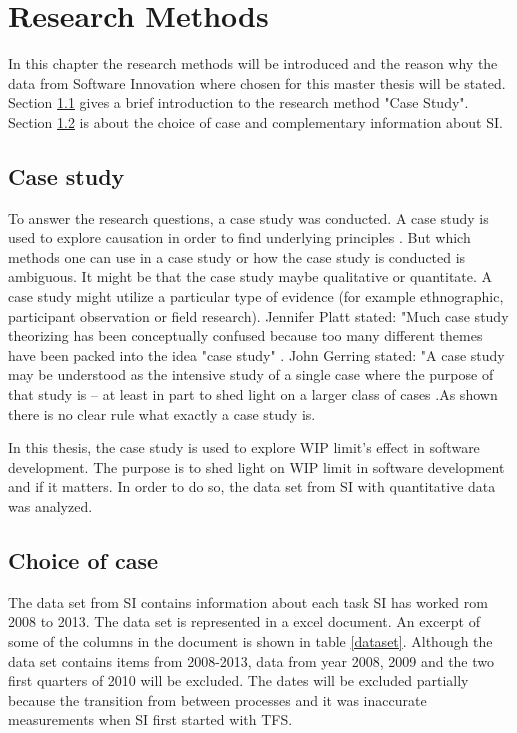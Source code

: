 \documentclass[UKenglish]{ifimaster}  %
\begin{document}
\chapter{Research Methods}
\label{chap:RM}
In this chapter the research methods will be introduced and the reason why the data from Software Innovation where chosen for this master thesis will be stated. Section \ref{sec:CS} gives a brief introduction to the research method "Case Study".  Section \ref{sec:coc} is about the choice of case and complementary information about SI. 


\section{Case study}
\label{sec:CS}
To answer the research questions, a case study was conducted.  A case study is used to explore causation in order to find underlying principles \parencite{0078285763}\parencite{9781412960991}.  But which methods one can use in a case study or how the case study is conducted is ambiguous.  It might be that the case study maybe qualitative or quantitate.  A case study might utilize a particular type of evidence (for example ethnographic, participant observation or field research).  Jennifer Platt stated: "Much case study theorizing has been conceptually confused because too many different themes have been packed into the idea "case study" \parencite{0521676568}.  John Gerring stated: "A case study may be understood as the intensive study of a single case where the purpose of that study is -- at least in part to shed light on a larger class of cases  \parencite{0521676568}.As shown there is no clear rule what exactly a case study is.


In this thesis, the case study is used to explore WIP limit's effect in software development. The purpose is to shed light on WIP limit in software development and if it matters. In order to do so, the data set from SI with quantitative data was analyzed.

\section{Choice of case}
\label{sec:coc}
The data set from SI contains information about each task SI has worked rom 2008 to 2013. The data set is represented in a excel document. An excerpt of some of the columns in the document is shown in table \ref{dataset}. Although the data set contains items from 2008-2013, data from year 2008, 2009 and the two first quarters of 2010 will be excluded. The dates will be excluded partially because the transition from between processes and it was inaccurate measurements when SI first started with TFS.
\end{document}
